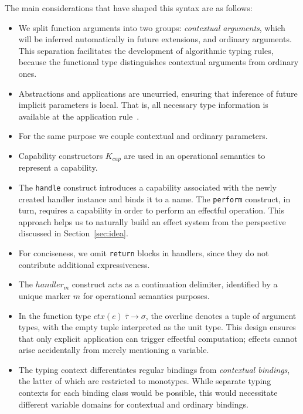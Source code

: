 \documentclass[acmsmall]{acmart}
\newcommand{\ctx}[1]{ctx(#1)~}
\begin{document}
The main considerations that have shaped this syntax are as follows:
\begin{itemize}
    \item We split function arguments into two groups: \emph{contextual arguments}, which will be inferred automatically in future extensions, and ordinary arguments.
    This separation facilitates the development of algorithmic typing rules, because the functional type distinguishes contextual arguments from ordinary ones.
    \item Abstractions and applications are uncurried, ensuring that inference of future implicit parameters is local.
    That is, all necessary type information is available at the application rule~\cite{pierce2000local}.
    \item For the same purpose we couple contextual and ordinary parameters.
    \item Capability constructors $K_{cap}$ are used in an operational semantics to represent a capability. %
    \item  The \texttt{handle} construct introduces a capability associated with the newly created handler instance and binds it to a name.
    The \texttt{perform} construct, in turn, requires a capability in order to perform an effectful operation.
    This approach helps us to naturally build an effect system from the perspective discussed in Section~\ref{sec:idea}.
    \item For conciseness, we omit \texttt{return} blocks in handlers, since they do not contribute additional expressiveness.
    \item The $handler_m$ construct acts as a continuation delimiter, identified by a unique marker $m$ for operational semantics purposes.
    \item In the function type $\ctx{e} \overline{\tau} \to \sigma$, the overline denotes a tuple of argument types, with the empty tuple interpreted as the unit type.
    This design ensures that only explicit application can trigger effectful computation; effects cannot arise accidentally from merely mentioning a variable.
    \item The typing context differentiates regular bindings from \emph{contextual bindings}, the latter of which are restricted to monotypes.
    While separate typing contexts for each binding class would be possible, this would necessitate different variable domains for contextual and ordinary bindings.
\end{itemize}
\end{document}
